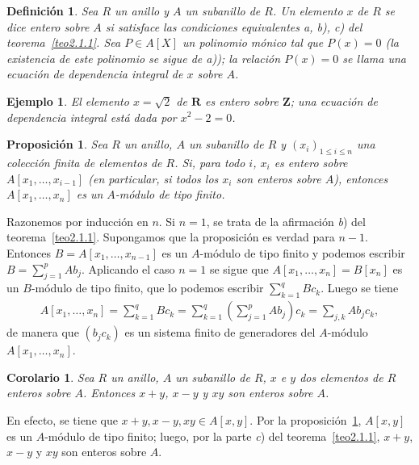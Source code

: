 \documentclass[bibtotoc,leqno,spanish]{amsbook}
\newcommand{\RR}{\mathbf{R}}
\newcommand{\ZZ}{\mathbf{Z}}
\numberwithin{equation}{section}
\theoremstyle{note}
\newtheorem{definition}{Definici\'on}
\theoremstyle{note}
\newtheorem{proposition}{Proposici\'on}
\newtheorem{corollary}{Corolario}
\theoremstyle{rem}
\newtheorem*{example*}{Ejemplo}
\numberwithin{theorem}{section}
\numberwithin{proposition}{section}
\numberwithin{definition}{section}
\numberwithin{lemma}{section}
\numberwithin{corollary}{section}
\numberwithin{example}{section}
\numberwithin{footnote}{section}%
\begin{document}
\begin{definition}\label{def2.1.1}
Sea $R$ un anillo y $A$ un subanillo de $R$. Un elemento $x$ de $R$ se dice entero sobre $A$ si satisface
las condiciones equivalentes a, b), c) del teorema~\ref{teo2.1.1}.
Sea $P\in A[X]$ un polinomio m\'onico tal que
$P(x) = 0$ (la existencia de este polinomio se sigue de a)); la relaci\'on $P(x) = 0$ se llama una
ecuaci\'on de dependencia integral de $x$ sobre $A$.
\end{definition}

\begin{example*}
El elemento $x = \sqrt{2}$ de $\RR$ es entero sobre $\ZZ$; una ecuaci\'on de dependencia
integral est\'a dada por $x^{2}-2 = 0$.
\end{example*}

\begin{proposition}\label{prop2.1.1}
Sea $R$ un anillo, $A$ un subanillo de $R$ y $(x_{i})_{1\leq i\leq n}$ una colecci\'on finita de elementos
de $R$. Si, para todo $i$, $x_{i}$ es entero sobre $A[x_{1},\dots,x_{i-1}]$ (en particular, si todos los
$x_{i}$ son enteros sobre $A$), entonces $A[x_{1},\dots,x_{n}]$ es un $A$-m\'odulo de tipo finito.
\end{proposition}

Razonemos por inducci\'on en $n$. Si $n=1$, se trata de la afirmaci\'on {\itshape b}) del teorema~\ref{teo2.1.1}. Supongamos que la
proposici\'on es verdad para $n-1$. Entonces $B = A[x_{1},\dots,x_{n-1}]$ es un $A$-m\'odulo de tipo finito
y podemos escribir $B = \sum_{j=1}^{p}Ab_{j}$. Aplicando el caso $n=1$ se sigue que $A[x_{1},\dots,x_{n}]
=B[x_{n}]$ es un $B$-m\'odulo de tipo finito, que lo podemos escribir $\sum_{k=1}^{q}Bc_{k}$. Luego se tiene
\begin{gather*}
A[x_{1},\dots,x_{n}] = \sum_{k=1}^{q}Bc_{k} = \sum_{k=1}^{q}\left(\sum_{j=1}^{p}Ab_{j}\right)c_{k} = \sum_{j,k}
Ab_{j}c_{k},
\end{gather*}
de manera que $(b_{j}c_{k})$ es un sistema finito de generadores del $A$-m\'odulo $A[x_{1},\dots,x_{n}]$.

\begin{corollary}\label{cor2.1.1}
Sea $R$ un anillo, $A$ un subanillo de $R$, $x$ e $y$ dos elementos de $R$ enteros sobre $A$. Entonces
$x+y$, $x-y$ y $xy$ son enteros sobre $A$.
\end{corollary}

En efecto, se tiene que $x+y, x-y, xy\in A[x,y]$. Por la proposici\'on~\ref{prop2.1.1},
$A[x,y]$ es un $A$-m\'odulo
de tipo finito; luego, por la parte {\itshape c}) del teorema~\ref{teo2.1.1},
$x+y$, $x-y$ y $xy$ son enteros sobre $A$.
\end{document}
